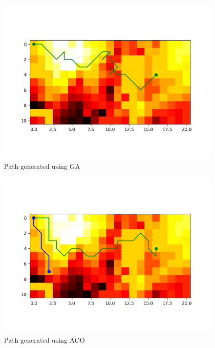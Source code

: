 \documentclass[conference]{IEEEtran}
\begin{document}
\begin{figure}[H]
\centerline{\includegraphics[scale=0.5]{performance/ga_1_drone}}
\caption{Path generated using GA}
\label{img:path_ga_1_drone}
\end{figure}

\begin{figure}[H]
\centerline{\includegraphics[scale=0.5]{performance/aco_2_drone}}
\caption{Path generated using ACO}
\label{img:path_aco_2_drone}
\end{figure}
\end{document}
